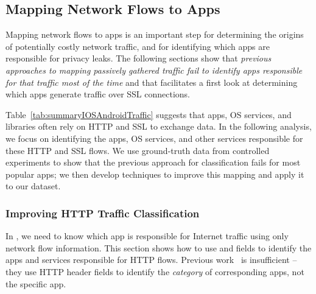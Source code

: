 \subsection{Mapping Network Flows to Apps}
\label{sec:classification-methodology}

Mapping network flows to apps is an important step for determining the origins of potentially costly 
network traffic, and for identifying which apps are responsible for privacy leaks. The following 
sections show that  \emph{previous approaches to mapping passively gathered traffic fail to identify
apps responsible for that traffic most of the time} and that \meddle facilitates a first look at 
determining which apps generate traffic over SSL connections.





Table~\ref{tab:summaryIOSAndroidTraffic} suggests that apps, OS services, and libraries often rely on HTTP and SSL to exchange data.
In the following analysis, we focus on identifying the apps, OS services, and other services responsible for these HTTP and SSL flows. 
We use ground-truth data from controlled experiments to show that the previous approach for classification fails 
for most popular apps; we then develop techniques to improve this mapping and apply it to our \mobWild dataset. 

\subsubsection{Improving HTTP Traffic Classification}
In \meddle, we need to know which app is responsible for Internet traffic using only network flow information. This section shows how to use \useragent and \httphost fields to identify the apps and services responsible for HTTP flows. Previous work~\cite{maier:mobtraffic,xu:appusage,falaki:mobileusage,falaki:smartphoneusage} is insufficient -- they use HTTP header fields to identify the \emph{category} of corresponding apps, not the specific app.


